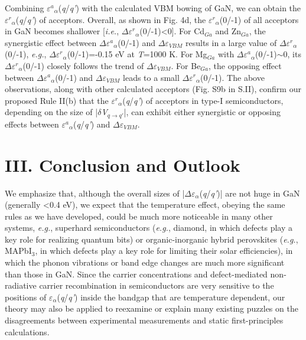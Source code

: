 \documentclass[onecolumn,preprint,superscriptaddress]{revtex4-1}
\begin{document}
Combining $\varepsilon$$^{a}$$_{\alpha}$(\emph{q}/\emph{q'}) with the calculated VBM bowing of GaN, we can obtain the $\varepsilon$$^{r}$$_{\alpha}$(\emph{q}/\emph{q'}) of acceptors. Overall, as shown in Fig. 4d, the $\varepsilon$$^{r}$$_{\alpha}$(0/-1) of all acceptors in GaN becomes shallower [\emph{i.e.}, $\Delta$$\varepsilon$$^{r}$$_{\alpha}$(0/-1)<0]. For Cd$_{Ga}$ and Zn$_{Ga}$, the synergistic effect between $\Delta$$\varepsilon$$^{a}$$_{\alpha}$(0/-1) and $\Delta$$\varepsilon$$_{VBM}$ results in a large value of $\Delta$$\varepsilon$$^{r}$$_{\alpha}$(0/-1), \emph{e.g.}, $\Delta$$\varepsilon$$^{r}$$_{\alpha}$(0/-1)=-0.15 eV at \emph{T}=1000 K. For Mg$_{Ga}$ with $\Delta$$\varepsilon$$^{a}$$_{\alpha}$(0/-1)$\sim$0, its $\Delta$$\varepsilon$$^{r}$$_{\alpha}$(0/-1) closely follows the trend of $\Delta$$\varepsilon$$_{VBM}$. For Be$_{Ga}$, the opposing effect between $\Delta$$\varepsilon$$^{a}$$_{\alpha}$(0/-1) and $\Delta$$\varepsilon$$_{VBM}$ leads to a small $\Delta$$\varepsilon$$^{r}$$_{\alpha}$(0/-1). The above observations, along with other calculated acceptors (Fig. S9b in S.II), confirm our proposed Rule II(b) that the $\varepsilon$$^{r}$$_{\alpha}$(\emph{q}/\emph{q'}) of acceptors in type-I semiconductors, depending on the size of |$\delta$\emph{V}$_{q\rightarrow q'}$|, can exhibit either synergistic or opposing effects between $\varepsilon$$^{a}$$_{\alpha}$(\emph{q}/\emph{q'}) and $\Delta$$\varepsilon$$_{VBM}$.
\section*{III. Conclusion and Outlook}
We emphasize that, although the overall sizes of |$\Delta$$\varepsilon$$_{\alpha}$(\emph{q}/\emph{q'})| are not huge in GaN (generally <0.4 eV), we expect that the temperature effect, obeying the same rules as we have developed, could be much more noticeable in many other systems, \emph{e.g.}, superhard semiconductors (\emph{e.g.}, diamond, in which defects play a key role for realizing quantum bits) or organic-inorganic hybrid perovskites (\emph{e.g.}, MAPbI$_3$, in which defects play a key role for limiting their solar efficiencies), in which the phonon vibrations or band edge changes are much more significant than those in GaN. Since the carrier concentrations and defect-mediated non-radiative carrier recombination in semiconductors are very sensitive to the positions of $\varepsilon$$_{\alpha}$(\emph{q}/\emph{q'}) inside the bandgap that are temperature dependent, our theory may also be applied to reexamine or explain many existing puzzles on the disagreements between experimental measurements and static first-principles calculations.
\end{document}
